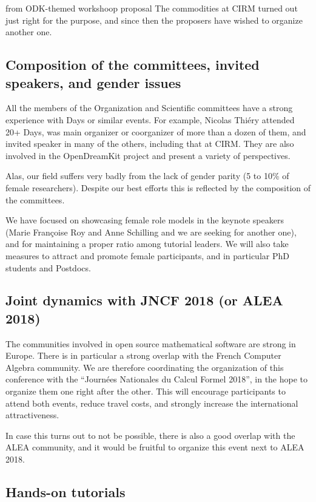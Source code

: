 \begin{oldpart}{from ODK-themed workshoop proposal}
The commodities at CIRM turned out just right for the purpose, and
since then the proposers have wished to organize another one.

\subsection{Composition of the committees, invited speakers, and gender issues}

All the members of the Organization and Scientific committees have a
strong experience with \Sage Days or similar events. For example,
Nicolas Thiéry attended 20+ \Sage Days, was main organizer or
coorganizer of more than a dozen of them, and invited speaker in many
of the others, including that at CIRM. They are also involved in the
OpenDreamKit project and present a variety of perspectives.

Alas, our field suffers very badly from the lack of gender parity (5
to 10\% of female researchers). Despite our best efforts this is reflected by the
composition of the committees.

We have focused on showcasing female role models in the keynote
speakers (Marie Françoise Roy and Anne Schilling and we are seeking
for another one), and for maintaining a proper ratio among tutorial
leaders. We will also take measures to attract and promote female
participants, and in particular PhD students and Postdocs.

\subsection{Joint dynamics with JNCF 2018 (or ALEA 2018)}

The communities involved in open source mathematical software are
strong in Europe. There is in particular a strong overlap with the
French Computer Algebra community. We are therefore coordinating the
organization of this conference with the ``Journées Nationales du
Calcul Formel 2018'', in the hope to organize them one right after the
other. This will encourage participants to attend both events, reduce
travel costs, and strongly increase the international attractiveness.

In case this turns out to not be possible, there is also a good
overlap with the ALEA community, and it would be fruitful to organize
this event next to ALEA 2018.

\subsection{Hands-on tutorials}


\end{oldpart}
